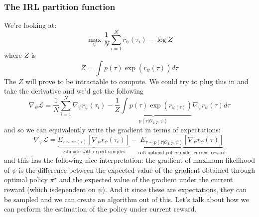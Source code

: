 \documentclass{report}
\begin{document}
\subsubsection{The IRL partition function}
We're looking at:
\begin{equation}
		\max_{\psi} \frac{1}{N} \sum_{i=1}^{N} r_{ \psi } (\tau_{ i }) -\log Z
\end{equation}
where $ Z  $ is
\begin{equation}
		Z = \int p (\tau) \exp (r_{ \psi } (\tau)) d\tau
\end{equation}
The $ Z  $ will prove to be intractable to compute.
We could try to plug this in and take the derivative and we'd get the following
\begin{equation}
\nabla_{ \psi } \mathcal{L} = 
\frac{1}{N}  \sum_{i=1}^{N} \nabla_{ \psi } r_{ \psi } (\tau_{ i })
- 
\underbrace{\frac{1}{Z} \int p (\tau) \exp (r_{ \psi (\tau) }) }_{ p (\tau| \mathcal{O}_{ 1:T }, \psi) }
\nabla_{ \psi } r_{ \psi } (\tau) d\tau
\end{equation}
and so we can equivalently write the gradient in terms of expectations:
\begin{equation}
\nabla_{ \psi } \mathcal{L} = 
\underbrace{E_{ \tau \sim \pi^{ \star } (\tau) } \left[ \nabla_{ \psi } r_{ \psi } (\tau_{ i })\right] }_{ \text{estimate with expert samples} }
- 
\underbrace{E_{ \tau \sim p (\tau|\mathcal{O}_{ 1:T }, \psi) } \left[ \nabla_{ \psi } r_{ \psi } (\tau) \right] }_{ \text{soft optimal policy under current reward} }
\end{equation}
and this has the following nice interpretation:
the gradient of maximum likelihood of $ \psi  $
is the difference between the expected value of the gradient obtained through optimal policy $ \pi^{ \star }  $
and the expected value of the gradient under the current reward (which isdependent on $ \psi  $).
And it since these are expectations, they can be sampled and we can create an algorithm out of this.
Let's talk about how we can perform the estimation of the policy under current reward.
\end{document}
